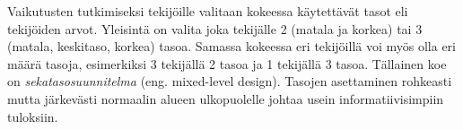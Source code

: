 \documentclass[12pt,a4paper,finnish]{tutthesis}
\begin{document}
Vaikutusten tutkimiseksi tekijöille valitaan kokeessa käytettävät tasot eli
tekijöiden arvot. Yleisintä on valita joka tekijälle 2 (matala ja korkea) tai
3 (matala, keskitaso, korkea) tasoa.
Samassa kokeessa eri tekijöillä voi myös olla eri määrä tasoja, esimerkiksi 3 tekijällä
2 tasoa ja 1 tekijällä 3 tasoa. Tällainen koe on
\textit{sekatasosuunnitelma} (eng.
mixed-level design).
Tasojen asettaminen rohkeasti mutta
järkevästi normaalin alueen ulkopuolelle johtaa usein informatiivisimpiin
tuloksiin.

%
%
%
\end{document}
